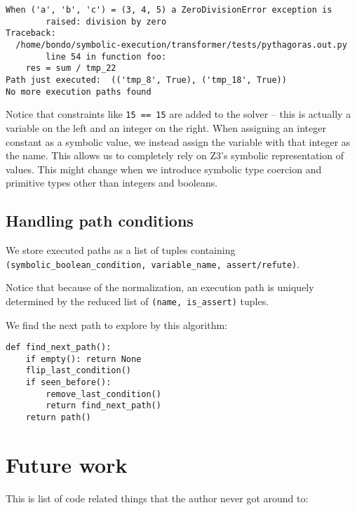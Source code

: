 \documentclass[11pt]{report}
\begin{document}
\begin{description}
\begin{verbatim}
When ('a', 'b', 'c') = (3, 4, 5) a ZeroDivisionError exception is
        raised: division by zero
Traceback:
  /home/bondo/symbolic-execution/transformer/tests/pythagoras.out.py
        line 54 in function foo:
    res = sum / tmp_22
Path just executed:  (('tmp_8', True), ('tmp_18', True))
No more execution paths found
\end{verbatim}

Notice that constraints like \verb|15 == 15| are added to the solver
-- this is actually a variable on the left and an integer on the
right. When assigning an integer constant as a symbolic value, we
instead assign the variable with that integer as the name. This allows
us to completely rely on Z3's symbolic representation of values. This
might change when we introduce symbolic type coercion and primitive
types other than integers and booleans.

\section{Handling path conditions}
We store executed paths as a list of tuples containing \\
\verb|(symbolic_boolean_condition, variable_name, assert/refute)|.

Notice that because of the normalization, an execution path is
uniquely determined by the reduced list of \verb|(name, is_assert)|
tuples.

We find the next path to explore by this algorithm:
\begin{verbatim}
def find_next_path():
    if empty(): return None
    flip_last_condition()
    if seen_before():
        remove_last_condition()
        return find_next_path()
    return path()
\end{verbatim}


\chapter{Future work}
\label{ch:future}

This is list of code related things that the author never got around
to:


\end{description}
\end{document}
